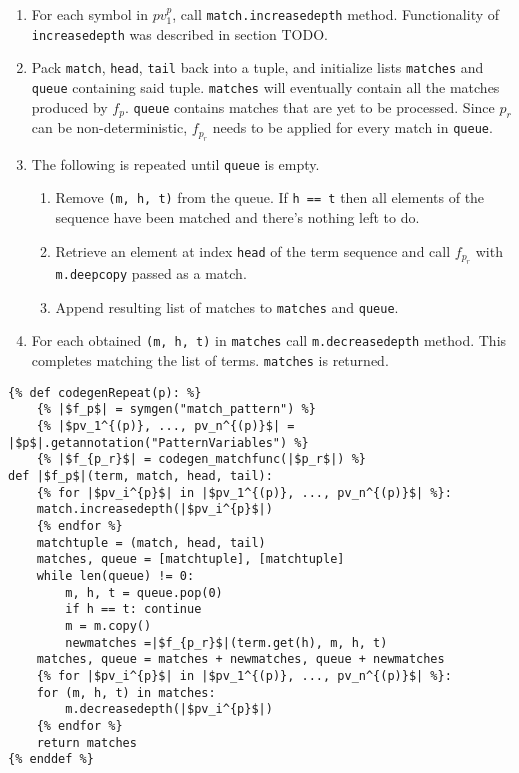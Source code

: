\begin{enumerate}
\item
For each symbol in $pv_1^{p}$, call \texttt{match.increasedepth} method. Functionality of \texttt{increasedepth} was described in section TODO. 
\item
Pack \texttt{match}, \texttt{head}, \texttt{tail} back into a tuple, and initialize lists \texttt{matches} and \texttt{queue} containing said tuple. \texttt{matches} will eventually contain all the matches produced by $f_p$. \texttt{queue} contains matches that are yet to be processed. Since $p_r$ can be non-deterministic, $f_{p_r}$ needs to be applied for every match in \texttt{queue}. 
\item The following is repeated until \texttt{queue} is empty. 
	\begin{enumerate}
	\item 
	Remove \texttt{(m, h, t)} from the queue. If \texttt{h == t} then all elements of the sequence have been matched and there's nothing left to do.  	
	\item
	Retrieve an element at index \texttt{head} of the term sequence and call $f_{p_r}$ with \texttt{m.deepcopy} passed as a match.
	\item Append resulting list of matches to \texttt{matches} and \texttt{queue}.
	\end{enumerate}

\item
For each obtained \texttt{(m, h, t)} in \texttt{matches} call \texttt{m.decreasedepth} method. This completes matching the list of terms. \texttt{matches} is returned.
\end{enumerate}

\begin{verbatim}
{% def codegenRepeat(p): %}
	{% |$f_p$| = symgen("match_pattern") %}
	{% |$pv_1^{(p)}, ..., pv_n^{(p)}$| = |$p$|.getannotation("PatternVariables") %}
	{% |$f_{p_r}$| = codegen_matchfunc(|$p_r$|) %}
def |$f_p$|(term, match, head, tail):
	{% for |$pv_i^{p}$| in |$pv_1^{(p)}, ..., pv_n^{(p)}$| %}:
	match.increasedepth(|$pv_i^{p}$|)
	{% endfor %}
	matchtuple = (match, head, tail)
	matches, queue = [matchtuple], [matchtuple]
	while len(queue) != 0:
		m, h, t = queue.pop(0)
		if h == t: continue
		m = m.copy()
		newmatches =|$f_{p_r}$|(term.get(h), m, h, t)
	matches, queue = matches + newmatches, queue + newmatches 
	{% for |$pv_i^{p}$| in |$pv_1^{(p)}, ..., pv_n^{(p)}$| %}:
	for (m, h, t) in matches: 
		m.decreasedepth(|$pv_i^{p}$|)
	{% endfor %}
	return matches
{% enddef %}
\end{verbatim}


